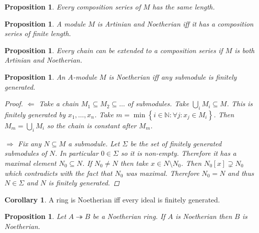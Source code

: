 \documentclass{article}
\newcommand{\N}{\mathbb{N}}
\newcommand{\setwith}[2]{\left\{#1:#2\right\}}
\newtheorem{proposition}[theorem]{Proposition}
\theoremstyle{definition}
\newtheorem{corollary}[theorem]{Corollary}
\begin{document}
\begin{proposition}
    Every composition series of \(M\) has the same length.
\end{proposition}

\begin{proposition}
    A module \(M\) is Artinian and Noetherian iff it has a composition series of
    finite length.
\end{proposition}

\begin{proposition}
    Every chain can be extended to a composition series if \(M\) is both
    Artinian and Noetherian.
\end{proposition}

\begin{proposition}
    An \(A\)-module \(M\) is Noetherian iff any submodule is finitely generated.

    \begin{proof}
        \(\Longleftarrow\) Take a chain \(M_{1}\subseteq M_{2}\subseteq\ldots\)
        of submodules. Take \(\bigcup_{i}M_{i}\subseteq M\). This is finitely
        generated by \(x_{1},\ldots,x_{n}\). Take
        \(m=\min\setwith{i\in\N}{\forall j:x_{j}\in M_{i}}\). Then
        \(M_{m}=\bigcup_{i}M_{i}\) so the chain is constant after \(M_{m}\).

        \(\Longrightarrow\) Fix any \(N\subseteq M\) a submodule. Let \(\Sigma\)
        be the set of finitely generated submodules of \(N\). In particular
        \(0\in\Sigma\) so it is non-empty. Therefore it has a maximal element
        \(N_{0}\subseteq N\). If \(N_{0}\neq N\) then take \(x\in N\setminus
        N_{0}\). Then \(N_{0}[x]\supsetneq N_{0}\) which contradicts with the
        fact that \(N_{0}\) was maximal. Therefore \(N_{0}=N\) and thus
        \(N\in\Sigma\) and \(N\) is finitely generated.
    \end{proof}
\end{proposition}

\begin{corollary}
    A ring is Noetherian iff every ideal is finitely generated.
\end{corollary}

\begin{proposition}
    Let \(A\twoheadrightarrow B\) be a Noetherian ring. If \(A\) is Noetherian
    then \(B\) is Noetherian.
\end{proposition}
\end{document}
